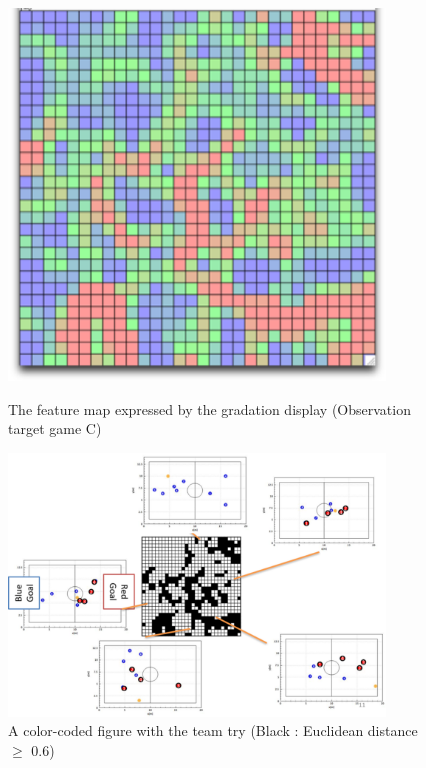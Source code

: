 \begin{figure}[ht]
  \begin{center}
  
    \includegraphics[clip,width=10.0cm]{figure/The_feature_map_expressed_by_the_gradation_display_Observation_target_game_C.eps}
    \caption{The feature map expressed by the gradation display 
(Observation target game C)}
    \label{fig:SOM_result11}
    
    \includegraphics[width=10.0cm]{figure/A_color-coded_figure_with_the_team_try_Black_Euclidean_distance_0.6.eps}
    \caption{A color-coded figure with the team try 
(Black : Euclidean distance $\geq$ 0.6)}
    \label{fig:SOM_result12}
    
  \end{center}
\end{figure}



\clearpage%


